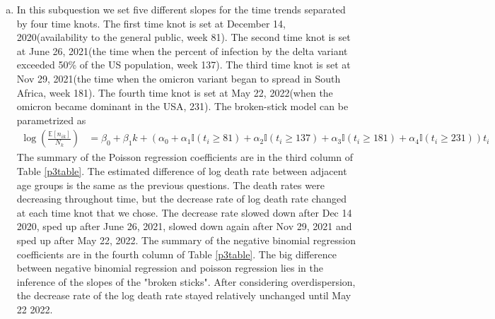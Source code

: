 \documentclass[12pt]{article}
\begin{document}
\begin{enumerate}[(a)]
	\item In this subquestion we set five different slopes for the time trends separated by four time knots. The first time knot is set at December 14, 2020(availability to the general public, week 81). The second time knot is set at June 26, 2021(the time when the percent of infection by the delta variant exceeded 50\% of the US population, week 137). The third time knot is set at Nov 29, 2021(the time when the omicron variant began to spread in South Africa, week 181). The fourth time knot is set at May 22, 2022(when the omicron became dominant in the USA, 231). The broken-stick model can be parametrized as
	 \begin{align*}
		\log(\frac{\mathbb{E}[n_{ik}]}{N_{k}}) &= \beta_{0} + \beta_{1}k + \left(\alpha_{0} + \alpha_{1}\mathbb{I}(t_{i} \geq 81) + \alpha_{2}\mathbb{I}(t_{i} \geq 137) +\alpha_{3} \mathbb{I}(t_{i} \geq 181) + \alpha_{4}\mathbb{I}(t_{i} \geq 231)\right) t_{i}
	\end{align*}
	The summary of the Poisson regression coefficients are in the third column of Table \ref{p3table}. The estimated difference of log death rate between adjacent age groups is the same as the previous questions. The death rates were decreasing throughout time, but the decrease rate of log death rate changed at each time knot that we chose. The decrease rate slowed down after Dec 14 2020, sped up after June 26, 2021, slowed down again after Nov 29, 2021 and sped up after May 22, 2022. The summary of the negative binomial regression coefficients are in the fourth column of Table \ref{p3table}. The big difference between negative binomial regression and poisson regression lies in the inference of the slopes of the "broken sticks". After considering overdispersion, the decrease rate of the log death rate stayed relatively unchanged until May 22 2022.
	

\end{enumerate}
\end{document}
